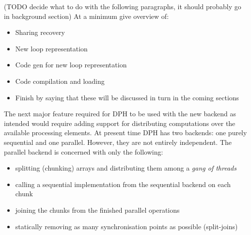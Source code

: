 \documentclass[preamble.tex]{subfiles}
\begin{document}


(TODO decide what to do with the following paragraphs, it should probably go in background section) At a minimum give overview of:
\begin{itemize}
\item Sharing recovery
\item New loop representation
\item Code gen for new loop representation
\item Code compilation and loading
\item Finish by saying that these will be discussed in turn in the coming sections
\end{itemize}

The next major feature required for DPH to be used with the new backend as intended would require adding support for distributing computations over the available processing elements. At present time DPH has two backends: one purely sequential and one parallel. However, they are not entirely independent. The parallel backend is concerned with only the following:
\begin{itemize}
\item splitting (chunking) arrays and distributing them among a \emph{gang of threads}
\item calling a sequential implementation from the sequential backend on each chunk
\item joining the chunks from the finished parallel operations
\item statically removing as many synchronisation points as possible (split-joins) 
\end{itemize}
\end{document}
